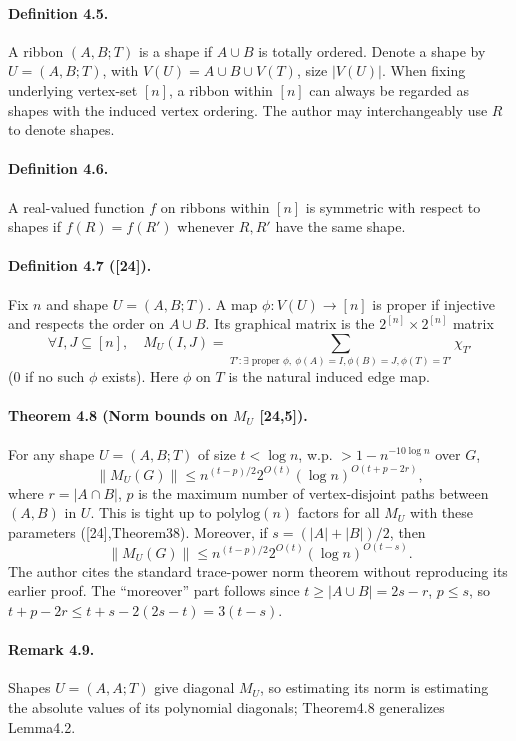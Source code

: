 \documentclass[10pt,a4paper]{article}
\begin{document}
\paragraph{Definition 4.5.} A ribbon $(A,B;T)$ is a shape if $A\cup B$ is totally ordered. Denote a shape by $U=(A,B;T)$, with $V(U)=A\cup B\cup V(T)$, size $|V(U)|$. When fixing underlying vertex-set $[n]$, a ribbon within $[n]$ can always be regarded as shapes with the induced vertex ordering. The author may interchangeably use $R$ to denote shapes.
\paragraph{Definition 4.6.} A real-valued function $f$ on ribbons within $[n]$ is symmetric with respect to shapes if $f(R)=f(R')$ whenever $R,R'$ have the same shape.
\paragraph{Definition 4.7 ([24]).} Fix $n$ and shape $U=(A,B;T)$. A map $\phi:V(U)\to[n]$ is proper if injective and respects the order on $A\cup B$. Its graphical matrix is the $2^{[n]}\times2^{[n]}$ matrix
\[\forall I,J\subseteq[n],\quad M_U(I,J)=\sum_{T':\exists\text{ proper }\phi,\ \phi(A)=I,\phi(B)=J,\phi(T)=T'}\chi_{T'}\]
(0 if no such $\phi$ exists). Here $\phi$ on $T$ is the natural induced edge map.
\paragraph{Theorem 4.8 (Norm bounds on $M_U$ [24,5]).} For any shape $U=(A,B;T)$ of size $t<\log n$, w.p. $>1-n^{-10\log n}$ over $G$,
\[\|M_U(G)\|\le n^{(t-p)/2}2^{O(t)}(\log n)^{O(t+p-2r)},\tag{4.6}\]
where $r=|A\cap B|$, $p$ is the maximum number of vertex-disjoint paths between $(A,B)$ in $U$. This is tight up to $\mathrm{polylog}(n)$ factors for all $M_U$ with these parameters ([24],Theorem38). Moreover, if $s=(|A|+|B|)/2$, then
\[\|M_U(G)\|\le n^{(t-p)/2}2^{O(t)}(\log n)^{O(t-s)}.\tag{4.7}\]
The author cites the standard trace-power norm theorem without reproducing its earlier proof. The ``moreover'' part follows since $t\ge|A\cup B|=2s-r$, $p\le s$, so $t+p-2r\le t+s-2(2s-t)=3(t-s)$.
\paragraph{Remark 4.9.} Shapes $U=(A,A;T)$ give diagonal $M_U$, so estimating its norm is estimating the absolute values of its polynomial diagonals; Theorem4.8 generalizes Lemma4.2.
\end{document}
